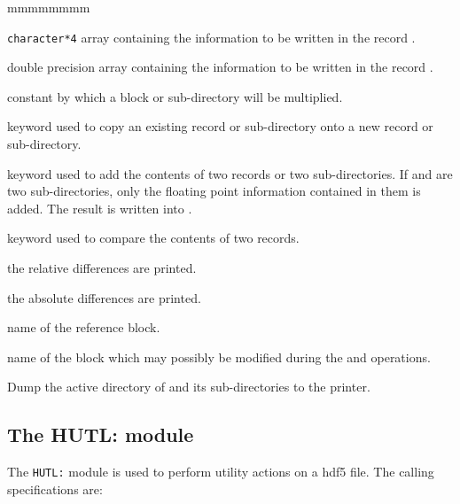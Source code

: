 \begin{ListeDeDescription}{mmmmmmmm}
\item[\dusa{hvalc}] {\tt character*4} array containing the information to be
written in the record .

\item[\dusa{dvalc}] double precision array containing the information to be
written in the record .

\item[\dusa{flott}] constant by which a block or sub-directory will be
multiplied.

\item[\moc{COPY}] keyword used to copy an existing record or sub-directory
onto a new record or sub-directory.

\item[\moc{ADD}] keyword used to add the contents of two records or two
sub-directories. If  and  are two
sub-directories, only the floating point information contained in them is added.
The result is written into .

\item[\moc{STAT}] keyword used to compare the contents of two records.

\item[\moc{REL}] the relative differences are printed.

\item[\moc{ABS}] the absolute differences are printed.

\item[\dusa{NOMREF}] name of the reference block.

\item[\dusa{NOMALT}] name of the block which may possibly be modified during
the  and  operations.

\item[\moc{DUMP}] Dump the active directory of and its
sub-directories to the printer.

\end{ListeDeDescription}

\clearpage

\subsection{The HUTL: module}\label{sect:HUTLData}

The {\tt HUTL:} module is used to perform utility actions on a {\sc hdf5} file.\cite{hdf5}
The calling specifications are:

